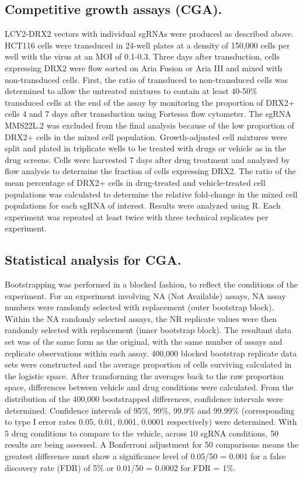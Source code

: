 \subsection{Competitive growth assays (CGA).}
LCV2-DRX2 vectors with individual sgRNAs were produced as described above. HCT116 cells were transduced in 24-well plates at a density of 150,000 cells per well with the virus at an MOI of 0.1-0.3. Three days after transduction, cells expressing DRX2 were flow sorted on Aria Fusion or Aria III and mixed with non-transduced cells. First, the ratio of transduced to non-transduced cells was determined to allow the untreated mixtures to contain at least 40-50\% transduced cells at the end of the assay by monitoring the proportion of DRX2+ cells 4 and 7 days after transduction using Fortessa flow cytometer. The sgRNA MMS22L.2 was excluded from the final analysis because of the low proportion of DRX2+ cells in the mixed cell population.  Growth-adjusted cell mixtures were split and plated in triplicate wells to be treated with drugs or vehicle as in the drug screens. Cells were harvested 7 days after drug treatment and analyzed by flow analysis to determine the fraction of cells expressing DRX2. The ratio of the mean percentage of DRX2+ cells in drug-treated and vehicle-treated cell populations was calculated to determine the relative fold-change in the mixed cell populations for each sgRNA of interest. Results were analyzed using R. Each experiment was repeated at least twice with three technical replicates per experiment.   

\subsection{Statistical analysis for CGA.}
Bootstrapping was performed in a blocked fashion, to reflect the conditions of the experiment. For an experiment involving NA (Not Available) assays, NA assay numbers were randomly selected with replacement (outer bootstrap block). Within the NA randomly selected assays, the NR replicate values were then randomly selected with replacement (inner bootstrap block). The resultant data set was of the same form as the original, with the same number of assays and replicate observations within each assay. 400,000 blocked bootstrap replicate data sets were constructed and the average proportion of cells surviving calculated in the logistic space. After transforming the averages back to the raw proportion space, differences between vehicle and drug conditions were calculated. From the distribution of the 400,000 bootstrapped differences, confidence intervals were determined. Confidence intervals of 95\%, 99\%, 99.9\% and 99.99\% (corresponding to type I error
rates 0.05, 0.01, 0.001, 0.0001 respectively) were determined. With 5 drug conditions to compare to the vehicle, across 10 sgRNA conditions, 50 results are being assessed. A Bonferroni adjustment for 50 comparisons means the greatest difference must show a significance level of 0.05/50 = 0.001 for a false discovery rate (FDR) of 5\% or 0.01/50 = 0.0002 for FDR = 1\%.

